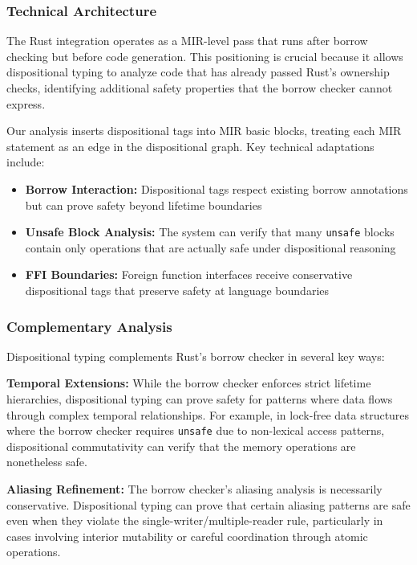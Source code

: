 \documentclass[journal]{IEEEtran}
\begin{document}
\subsubsection{Technical Architecture}

The Rust integration operates as a MIR-level pass that runs after borrow checking but before code generation. This positioning is crucial because it allows dispositional typing to analyze code that has already passed Rust's ownership checks, identifying additional safety properties that the borrow checker cannot express.

Our analysis inserts dispositional tags into MIR basic blocks, treating each MIR statement as an edge in the dispositional graph. Key technical adaptations include:

\begin{itemize}
\item \textbf{Borrow Interaction:} Dispositional tags respect existing borrow annotations but can prove safety beyond lifetime boundaries
\item \textbf{Unsafe Block Analysis:} The system can verify that many \texttt{unsafe} blocks contain only operations that are actually safe under dispositional reasoning
\item \textbf{FFI Boundaries:} Foreign function interfaces receive conservative dispositional tags that preserve safety at language boundaries
\end{itemize}

\subsubsection{Complementary Analysis}

Dispositional typing complements Rust's borrow checker in several key ways:

\textbf{Temporal Extensions:} While the borrow checker enforces strict lifetime hierarchies, dispositional typing can prove safety for patterns where data flows through complex temporal relationships. For example, in lock-free data structures where the borrow checker requires \texttt{unsafe} due to non-lexical access patterns, dispositional commutativity can verify that the memory operations are nonetheless safe.

\textbf{Aliasing Refinement:} The borrow checker's aliasing analysis is necessarily conservative. Dispositional typing can prove that certain aliasing patterns are safe even when they violate the single-writer/multiple-reader rule, particularly in cases involving interior mutability or careful coordination through atomic operations.
\end{document}
